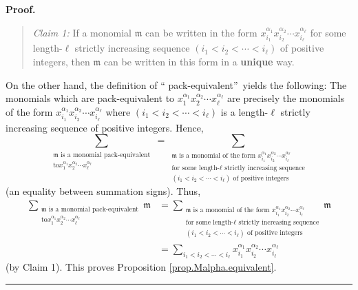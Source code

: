 \documentclass[numbers=enddot,12pt,final,onecolumn,notitlepage,abstracton]{scrartcl}
\theoremstyle{definition}
\newenvironment{statement}{\begin{quote}}{\end{quote}}
\newenvironment{proof}[1][Proof]{\noindent\textbf{#1.} }{\ \rule{0.5em}{0.5em}}
\let\sumnonlimits\sum
\renewcommand{\sum}{\sumnonlimits\limits}
\newenvironment{verlong}{}{}
\begin{document}
\begin{verlong}
\begin{footnotesize}
\begin{proof}
\begin{statement}
\textit{Claim 1:} If a monomial $\mathfrak{m}$ can be written in the form
$x_{i_{1}}^{\alpha_{1}}x_{i_{2}}^{\alpha_{2}}\cdots x_{i_{\ell}}^{\alpha
_{\ell}}$ for some length-$\ell$ strictly increasing sequence $\left(
i_{1}<i_{2}<\cdots<i_{\ell}\right)  $ of positive integers, then
$\mathfrak{m}$ can be written in this form in a \textbf{unique} way.
\end{statement}

On the other hand, the definition of \textquotedblleft
pack-equivalent\textquotedblright\ yields the following: The monomials which
are pack-equivalent to $x_{1}^{\alpha_{1}}x_{2}^{\alpha_{2}}\cdots x_{\ell
}^{\alpha_{\ell}}$ are precisely the monomials of the form $x_{i_{1}}%
^{\alpha_{1}}x_{i_{2}}^{\alpha_{2}}\cdots x_{i_{\ell}}^{\alpha_{\ell}}$ where
$\left(  i_{1}<i_{2}<\cdots<i_{\ell}\right)  $ is a length-$\ell$ strictly
increasing sequence of positive integers. Hence,%
\[
\sum_{\substack{\mathfrak{m}\text{ is a monomial pack-equivalent}\\\text{to
}x_{1}^{\alpha_{1}}x_{2}^{\alpha_{2}}\cdots x_{\ell}^{\alpha_{\ell}}}%
}=\sum_{\substack{\mathfrak{m}\text{ is a monomial of the form }x_{i_{1}%
}^{\alpha_{1}}x_{i_{2}}^{\alpha_{2}}\cdots x_{i_{\ell}}^{\alpha_{\ell}%
}\\\text{for some length-}\ell\text{ strictly increasing sequence}\\\left(
i_{1}<i_{2}<\cdots<i_{\ell}\right)  \text{ of positive integers}}}
\]
(an equality between summation signs). Thus,%
\begin{align*}
\sum_{\substack{\mathfrak{m}\text{ is a monomial pack-equivalent}\\\text{to
}x_{1}^{\alpha_{1}}x_{2}^{\alpha_{2}}\cdots x_{\ell}^{\alpha_{\ell}}%
}}\mathfrak{m}  &  =\sum_{\substack{\mathfrak{m}\text{ is a monomial of the
form }x_{i_{1}}^{\alpha_{1}}x_{i_{2}}^{\alpha_{2}}\cdots x_{i_{\ell}}%
^{\alpha_{\ell}}\\\text{for some length-}\ell\text{ strictly increasing
sequence}\\\left(  i_{1}<i_{2}<\cdots<i_{\ell}\right)  \text{ of positive
integers}}}\mathfrak{m}\\
&  =\sum_{i_{1}<i_{2}<\cdots<i_{\ell}}x_{i_{1}}^{\alpha_{1}}x_{i_{2}}%
^{\alpha_{2}}\cdots x_{i_{\ell}}^{\alpha_{\ell}}%
\end{align*}
(by Claim 1). This proves Proposition \ref{prop.Malpha.equivalent}.
\end{proof}


\end{footnotesize}
\end{verlong}
\end{document}
